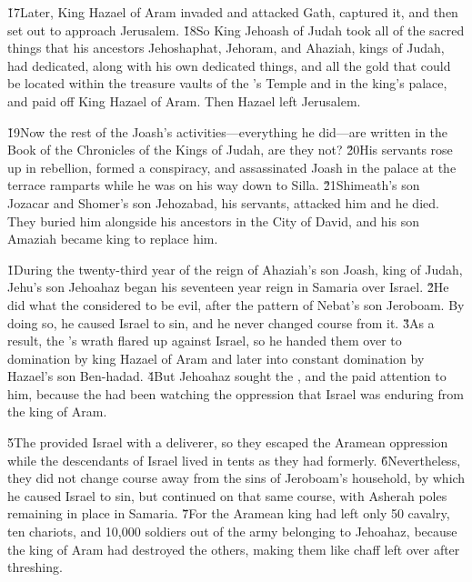 \v{17}Later, King Hazael of Aram invaded and attacked Gath, captured it, and then set out to approach Jerusalem. \v{18}So King Jehoash of Judah took all of the sacred things that his ancestors Jehoshaphat, Jehoram, and Ahaziah, kings of Judah, had dedicated, along with his own dedicated things, and all the gold that could be located within the treasure vaults of the 's Temple and in the king's palace, and paid off King Hazael of Aram. Then Hazael left Jerusalem.

\v{19}Now the rest of the Joash's activities---everything he did---are written in the Book of the Chronicles of the Kings of Judah, are they not? \v{20}His servants rose up in rebellion, formed a conspiracy, and assassinated Joash in the palace at the terrace ramparts while he was on his way down to Silla. \v{21}Shimeath's son Jozacar and Shomer's son Jehozabad, his servants, attacked him and he died. They buried him alongside his ancestors in the City of David, and his son Amaziah became king to replace him.

\v{1}During the twenty-third year of the reign of Ahaziah's son Joash, king of Judah, Jehu's son Jehoahaz began his seventeen year reign in Samaria over Israel. \v{2}He did what the  considered to be evil, after the pattern of Nebat's son Jeroboam. By doing so, he caused Israel to sin, and he never changed course from it. \v{3}As a result, the 's wrath flared up against Israel, so he handed them over to domination by king Hazael of Aram and later into constant domination by Hazael's son Ben-hadad. \v{4}But Jehoahaz sought the , and the  paid attention to him, because the  had been watching the oppression that Israel was enduring from the king of Aram.

\v{5}The  provided Israel with a deliverer, so they escaped the Aramean oppression while the descendants of Israel lived in tents as they had formerly. \v{6}Nevertheless, they did not change course away from the sins of Jeroboam's household, by which he caused Israel to sin, but continued on that same course, with Asherah poles remaining in place in Samaria. \v{7}For the Aramean king had left only 50 cavalry, ten chariots, and 10,000 soldiers out of the army belonging to Jehoahaz, because the king of Aram had destroyed the others, making them like chaff left over after threshing.

